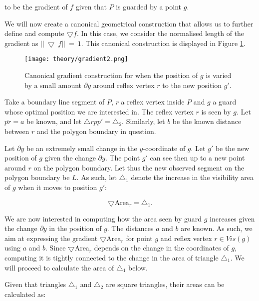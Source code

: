 to be the gradient of $f$ given that $P$ is guarded by a point $g$. 

We will now create a canonical geometrical construction that allows us to further define and compute $\bigtriangledown f$. In this case, we consider the normalised length of the gradient as $||~\bigtriangledown~f||~=~1$. This canonical construction is displayed in Figure \ref{fig:gradient}. 

\begin{figure}[h!]
    \centering
    \texttt{[image: theory/gradient2.png]}
    \caption{Canonical gradient construction for when the position of $g$ is varied by a small amount $\partial y$ around reflex vertex $r$ to the new position $g'$.}
    \label{fig:gradient}
\end{figure}

Take a boundary line segment of $P$, $r$ a reflex vertex inside $P$ and $g$ a guard whose optimal position we are interested in. The reflex vertex $r$ is seen by $g$. Let $\overline{pr} = a$ be known, and let $\triangle rpp' = \triangle_2$. Similarly, let $b$ be the known distance between $r$ and the polygon boundary in question.


Let $\partial y$ be an extremely small change in the $y$-coordinate of $g$. Let $g'$ be the new position of $g$ given the change $\partial y$. The point $g'$ can see then up to a new point around $r$ on the polygon boundary. Let thus the new observed segment on the polygon boundary be $L$. As such, let $\triangle_1$ denote the increase in the visibility area of $g$ when it moves to position $g'$:

\begin{equation}
    \bigtriangledown \text{Area}_r = \triangle_1. \label{eq:derivative}
\end{equation}

We are now interested in computing how the area seen by guard $g$ increases given the change $\partial y$ in the position of $g$. The distances $a$ and $b$ are known. As such, we aim at expressing the gradient $\bigtriangledown \text{Area}_r$ for point $g$ and reflex vertex $r \in \mathit{Vis}(g)$ using $a$ and $b$. Since $\bigtriangledown \text{Area}_r$ depends on the change in the coordinates of $g$, computing it is tightly connected to the change in the area of triangle $\triangle_1$. We will proceed to calculate the area of $\triangle_1$ below.

Given that triangles $\triangle_1$ and $\triangle_2$ are square triangles, their areas can be calculated as:

